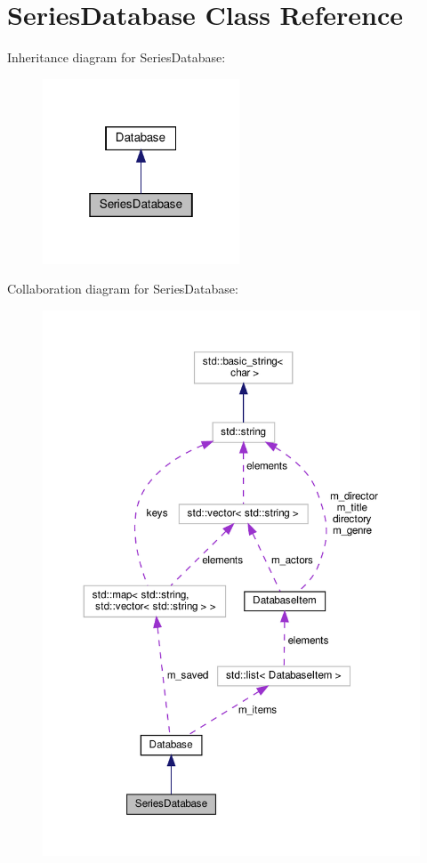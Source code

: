 \hypertarget{classSeriesDatabase}{}\section{Series\+Database Class Reference}
\label{classSeriesDatabase}


Inheritance diagram for Series\+Database\+:\nopagebreak
\begin{figure}[H]
\begin{center}
\leavevmode
\includegraphics[width=166pt]{classSeriesDatabase__inherit__graph}
\end{center}
\end{figure}


Collaboration diagram for Series\+Database\+:\nopagebreak
\begin{figure}[H]
\begin{center}
\leavevmode
\includegraphics[width=350pt]{classSeriesDatabase__coll__graph}
\end{center}
\end{figure}
